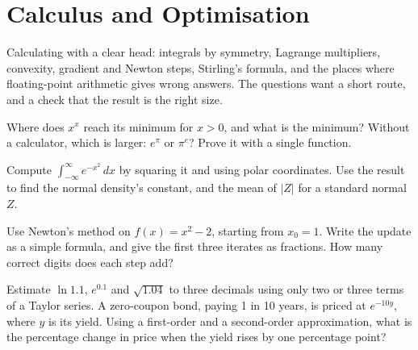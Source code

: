 \chapter{Calculus and Optimisation}\label{ch:iv1:calculus-and-optimisation}

\begin{ivtrains}
Calculating with a clear head: integrals by symmetry, Lagrange multipliers, convexity, gradient and Newton steps, Stirling's formula, and the places where floating-point arithmetic gives wrong answers. The questions want a short route, and a check that the result is the right size.
\end{ivtrains}

\begin{question}\label{iq:iv1:calculus-and-optimisation:1}
Where does $x^x$ reach its minimum for $x > 0$, and what is the minimum? Without a calculator, which is larger: $e^\pi$ or $\pi^e$? Prove it with a single function.
\end{question}

\begin{question}\label{iq:iv1:calculus-and-optimisation:2}
Compute $\int_{-\infty}^{\infty} e^{-x^2}\,dx$ by squaring it and using polar coordinates. Use the result to find the normal density's constant, and the mean of $|Z|$ for a standard normal $Z$.
\end{question}

\begin{question}\label{iq:iv1:calculus-and-optimisation:3}
Use Newton's method on $f(x) = x^2 - 2$, starting from $x_0 = 1$. Write the update as a simple formula, and give the first three iterates as fractions. How many correct digits does each step add?
\end{question}

\begin{question}\label{iq:iv1:calculus-and-optimisation:4}
Estimate $\ln 1.1$, $e^{0.1}$ and $\sqrt{1.04}$ to three decimals using only two or three terms of a Taylor series. A zero-coupon bond, paying 1 in 10 years, is priced at $e^{-10y}$, where $y$ is its yield. Using a first-order and a second-order approximation, what is the percentage change in price when the yield rises by one percentage point?
\end{question}

